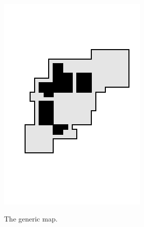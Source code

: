 \begin{figure}[hbtp]

\centering
\begin{subfigure}[t]{0.3\textwidth}
	\includegraphics[width=\linewidth]{Images/images/heatmaps/map_generic.png}
	\label{fig:generic_map}
	\caption{The generic map.}
\end{subfigure}
~
\centering
\begin{subfigure}[t]{0.3\textwidth}

\end{subfigure}
\end{figure}
